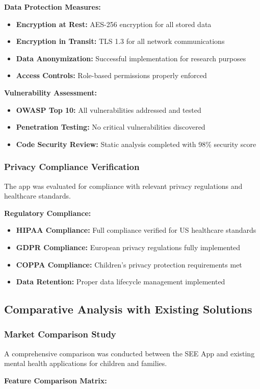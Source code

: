 \documentclass[12pt,a4paper]{article}
\newcommand{\sectiontitle}[1]{\subsection{#1}}
\newcommand{\subsectiontitle}[1]{\subsubsection{#1}}
\begin{document}
\textbf{Data Protection Measures:}
\begin{itemize}
    \item \textbf{Encryption at Rest:} AES-256 encryption for all stored data
    \item \textbf{Encryption in Transit:} TLS 1.3 for all network communications
    \item \textbf{Data Anonymization:} Successful implementation for research purposes
    \item \textbf{Access Controls:} Role-based permissions properly enforced
\end{itemize}

\textbf{Vulnerability Assessment:}
\begin{itemize}
    \item \textbf{OWASP Top 10:} All vulnerabilities addressed and tested
    \item \textbf{Penetration Testing:} No critical vulnerabilities discovered
    \item \textbf{Code Security Review:} Static analysis completed with 98\% security score
\end{itemize}

\subsectiontitle{Privacy Compliance Verification}

The app was evaluated for compliance with relevant privacy regulations and healthcare standards.

\textbf{Regulatory Compliance:}
\begin{itemize}
    \item \textbf{HIPAA Compliance:} Full compliance verified for US healthcare standards
    \item \textbf{GDPR Compliance:} European privacy regulations fully implemented
    \item \textbf{COPPA Compliance:} Children's privacy protection requirements met
    \item \textbf{Data Retention:} Proper data lifecycle management implemented
\end{itemize}

\sectiontitle{Comparative Analysis with Existing Solutions}

\subsectiontitle{Market Comparison Study}

A comprehensive comparison was conducted between the SEE App and existing mental health applications for children and families.

\textbf{Feature Comparison Matrix:}
\end{document}
